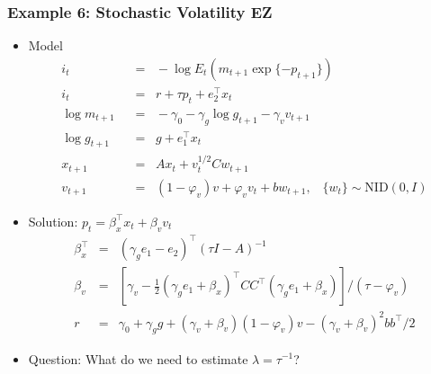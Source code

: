 \documentclass{beamer}
\begin{document}
\begin{frame}
\frametitle{Example 6: Stochastic Volatility EZ}
\begin{itemize} \itemsep=\bigskipamount
\item Model
\begin{align*}
    i_t &\;\;=\;\;  - \log E_t \left( m_{t+1} \exp\{- p_{t+1}\} \right)  \tag{Euler equation} \\
    i_t &\;\;=\;\;  r + \tau p_{t} +  e_2^\top x_{t} \tag{Taylor rule} \\
    \log m_{t+1} &\;\;=\;\; - \gamma_{0} - \gamma_{g} \log g_{t+1} -\gamma_{v}v_{t+1} \\
    \log g_{t+1} &\;\;=\;\; g + e_1^\top x_t \\
    x_{t+1} &\;\;=\;\; A x_{t} + v_{t}^{1/2} C w_{t+1} \\
    v_{t+1} &\;\;=\;\; (1-\varphi_{v})v+\varphi_{v}v_{t}+bw_{t+1},
            \;\;\;\{ w_t \} \sim \mbox{NID}(0,I)
\end{align*}
\item Solution:  $ p_t = \beta_{x}^\top x_t +\beta_{v} v_{t}$ 
\begin{eqnarray*}
    \beta^\top_{x} &=& (\gamma_{g} e_1 - e_2)^\top (\tau I - A)^{-1} \\
    \beta_{v} &=& [\gamma_{v}-\frac{1}{2}(\gamma_{g} e_1 + \beta_{x})^\top C C^\top (\gamma_{g} e_1 + \beta_{x})]/(\tau-\varphi_{v}) \\
    r &=& \gamma_{0} + \gamma_{g}g + (\gamma_{v}+\beta_{v}) (1-\varphi_{v})v -(\gamma_{v}+\beta_{v})^{2}bb^{\top}/2
\end{eqnarray*}

\item Question:  What do we need to estimate $\lambda = \tau^{-1}$?
\end{itemize}
\end{frame}
\end{document}
